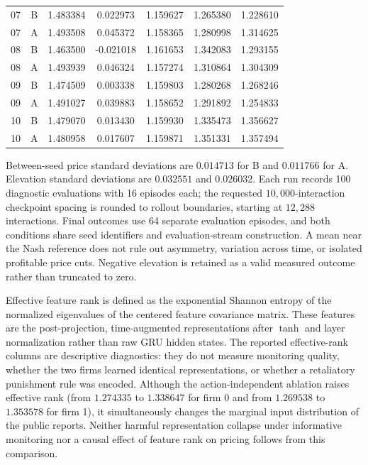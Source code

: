 \documentclass{article}
\begin{document}
\begin{table}[t]
\begin{tabular}{@{}ccSSSSS@{}}
07 & B & 1.483384 & 0.022973 & 1.159627 & 1.265380 & 1.228610 \\
07 & A & 1.493508 & 0.045372 & 1.158365 & 1.280998 & 1.314625 \\
08 & B & 1.463500 & -0.021018 & 1.161653 & 1.342083 & 1.293155 \\
08 & A & 1.493939 & 0.046324 & 1.157274 & 1.310864 & 1.304309 \\
09 & B & 1.474509 & 0.003338 & 1.159803 & 1.280268 & 1.268246 \\
09 & A & 1.491027 & 0.039883 & 1.158652 & 1.291892 & 1.254833 \\
10 & B & 1.479070 & 0.013430 & 1.159930 & 1.335473 & 1.356627 \\
10 & A & 1.480958 & 0.017607 & 1.159871 & 1.351331 & 1.357494 \\
\bottomrule
\end{tabular}
\end{table}

Between-seed price standard deviations are $0.014713$ for B and $0.011766$ for A. Elevation standard deviations are $0.032551$ and $0.026032$. Each run records 100 diagnostic evaluations with 16 episodes each; the requested $10{,}000$-interaction checkpoint spacing is rounded to rollout boundaries, starting at $12{,}288$ interactions. Final outcomes use 64 separate evaluation episodes, and both conditions share seed identifiers and evaluation-stream construction. A mean near the Nash reference does not rule out asymmetry, variation across time, or isolated profitable price cuts. Negative elevation is retained as a valid measured outcome rather than truncated to zero.

Effective feature rank is defined as the exponential Shannon entropy of the normalized eigenvalues of the centered feature covariance matrix. These features are the post-projection, time-augmented representations after $\tanh$ and layer normalization rather than raw GRU hidden states. The reported effective-rank columns are descriptive diagnostics: they do not measure monitoring quality, whether the two firms learned identical representations, or whether a retaliatory punishment rule was encoded. Although the action-independent ablation raises effective rank (from $1.274335$ to $1.338647$ for firm 0 and from $1.269538$ to $1.353578$ for firm 1), it simultaneously changes the marginal input distribution of the public reports. Neither harmful representation collapse under informative monitoring nor a causal effect of feature rank on pricing follows from this comparison.
\end{document}

